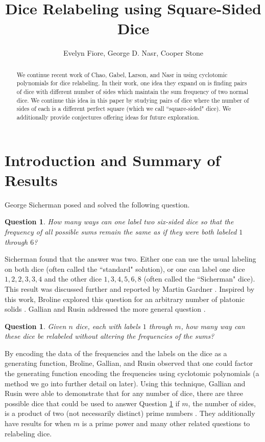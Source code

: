 \documentclass[11pt]{amsart}
\title{Dice Relabeling using Square-Sided Dice}
\author{Evelyn Fiore, George D. Nasr, Cooper Stone}
\date{}
\numberwithin{equation}{section}
\theoremstyle{plain}
\newtheorem {question}[equation]{Question}
\theoremstyle{definition}
\begin{document}
\maketitle


\begin{abstract}
We continue recent work of Chao, Gabel, Larson, and Nasr in using cyclotomic polynomials for dice relabeling. In their work, one idea they expand on is finding pairs of dice with different number of sides which maintain the sum frequency of two normal dice. We continue this idea in this paper by studying pairs of dice where the number of sides of each is a different perfect square (which we call ``square-sided" dice). We additionally provide conjectures offering ideas for future exploration.\end{abstract}

\section{Introduction and Summary of Results}


George Sicherman posed and solved the following question. 


\begin{question}
 How many ways can one label two six-sided dice so that the frequency of all possible sums remain the same as if they were both labeled $1$ through $6$?
\end{question}

Sicherman found that the answer was two. Either one can use the usual labeling on both dice (often called the ``standard" solution), or one can label one dice $1,2,2,3,3,4$ and the other dice $1,3,4,5,6,8$ (often called the ``Sicherman" dice). This result was discussed further and reported by Martin Gardner \cite{gardner}. Inspired by this work, Broline explored this question for an arbitrary number of platonic solids \cite{b}. Gallian and Rusin addressed the more general question \cite{gc}.

\begin{question}\label{qu:gen}
  Given $n$ dice, each with labels $1$ through $m$, how many way can these dice be relabeled without altering the frequencies of the sums? 
\end{question}
 By encoding the data of the frequencies and the labels on the dice as a generating function, Broline, Gallian, and Rusin observed that one could factor the generating function encoding the frequencies using cyclotomic polynomials (a method we go into further detail on later). Using this technique, Gallian and Rusin were able to demonstrate that for any number of dice, there are three possible dice that could be used to answer Question \ref{qu:gen} if $m$, the number of sides, is a product of two (not necessarily distinct) prime numbers \cite[Theorem 2]{gc}. They additionally have results for when $m$ is a prime power and many other related questions to relabeling dice. 
\end{document}
